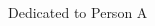 
\clearpage

\begin{adjustwidth}{0.23\textwidth}{0.23\textwidth}
\begingroup
  \null\vspace{0.3\textheight}
  \Large\itshape
  \begin{center}
    Dedicated to Person A
  \end{center}
\endgroup
\end{adjustwidth}

\clearpage